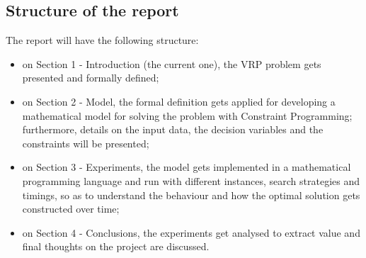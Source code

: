 \documentclass[../main.tex]{subfiles}
\begin{document}
\subsection{Structure of the report}
The report will have the following structure:
\begin{itemize}
    \item on Section 1 - Introduction (the current one), the VRP problem gets presented and formally defined;
    \item on Section 2 - Model, the formal definition gets applied for developing a mathematical model for solving the problem with Constraint Programming; furthermore, details on the input data, the decision variables and the constraints will be presented;
    \item on Section 3 - Experiments, the model gets implemented in a mathematical programming language and run with different instances, search strategies and timings, so as to understand the behaviour and how the optimal solution gets constructed over time;
    \item on Section 4 - Conclusions, the experiments get analysed to extract value and final thoughts on the project are discussed.
\end{itemize}
\end{document}
